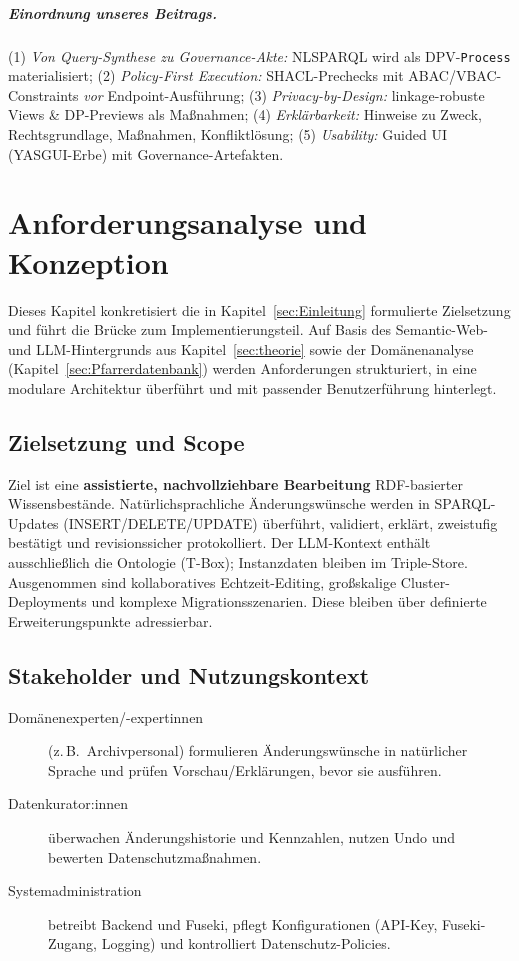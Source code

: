 \paragraph{Einordnung unseres Beitrags.}
(1) \emph{Von Query-Synthese zu Governance-Akte:} NL{\textrightarrow}SPARQL wird als DPV-\texttt{Process} materialisiert; (2) \emph{Policy-First Execution:} SHACL-Prechecks mit ABAC/VBAC-Constraints \emph{vor} Endpoint-Ausführung; (3) \emph{Privacy-by-Design:} linkage-robuste Views \& DP-Previews als Maßnahmen; (4) \emph{Erklärbarkeit:} Hinweise zu Zweck, Rechtsgrundlage, Maßnahmen, Konfliktlösung; (5) \emph{Usability:} Guided UI (YASGUI-Erbe) mit Governance-Artefakten.




\chapter{Anforderungsanalyse und Konzeption}
\label{sec:konzeption}

Dieses Kapitel konkretisiert die in Kapitel~\ref{sec:Einleitung} formulierte Zielsetzung und führt die Brücke zum Implementierungsteil. Auf Basis des Semantic-Web- und LLM-Hintergrunds aus Kapitel~\ref{sec:theorie} sowie der Domänenanalyse (Kapitel~\ref{sec:Pfarrerdatenbank}) werden Anforderungen strukturiert, in eine modulare Architektur überführt und mit passender Benutzerführung hinterlegt.

\section{Zielsetzung und Scope}
Ziel ist eine \textbf{assistierte, nachvollziehbare Bearbeitung} RDF-basierter Wissensbestände. Natürlichsprachliche Änderungswünsche werden in SPARQL-Updates (INSERT/DELETE/UPDATE) überführt, validiert, erklärt, zweistufig bestätigt und revisionssicher protokolliert. Der LLM-Kontext enthält ausschließlich die Ontologie (T-Box); Instanzdaten bleiben im Triple-Store. Ausgenommen sind kollaboratives Echtzeit-Editing, großskalige Cluster-Deployments und komplexe Migrationsszenarien. Diese bleiben über definierte Erweiterungspunkte adressierbar.

\section{Stakeholder und Nutzungskontext}
\begin{description}
  \item[Domänenexperten/-expertinnen] (z.\,B.\ Archivpersonal) formulieren Änderungswünsche in natürlicher Sprache und prüfen Vorschau/Erklärungen, bevor sie ausführen.
  \item[Datenkurator:innen] überwachen Änderungshistorie und Kennzahlen, nutzen Undo und bewerten Datenschutzmaßnahmen.
  \item[Systemadministration] betreibt Backend und Fuseki, pflegt Konfigurationen (API-Key, Fuseki-Zugang, Logging) und kontrolliert Datenschutz-Policies.
\end{description}

